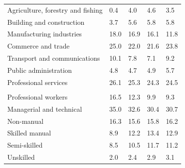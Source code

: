 \documentclass{article}
\begin{document}
\begin{table}[h]
\begin{tabular}{KTTTT}
    \hline
Agriculture, forestry and fishing  & 0.4& 4.0& 4.6& 3.5\\
Building and construction & 3.7& 5.6& 5.8& 5.8\\
Manufacturing industries & 18.0& 16.9& 16.1& 11.8\\
Commerce and trade  & 25.0& 22.0& 21.6& 23.8\\
Transport and communications  & 10.1&  7.8&  7.1&  9.2\\
Public administration & 4.8& 4.7& 4.9& 5.7\\
Professional services & 26.1& 25.3& 24.3& 24.5\\
\hline
    \\ 
    \hline
Professional workers  & 16.5& 12.3 &  9.9&  9.3\\
Managerial and technical & 35.0& 32.6& 30.4& 30.7\\
Non-manual & 16.3& 15.6& 15.8& 16.2\\
Skilled manual &  8.9& 12.2& 13.4& 12.9\\
Semi-skilled &  8.5& 10.5& 11.7& 11.2\\
Unskilled  & 2.0& 2.4& 2.9& 3.1\\
\end{tabular}
\end{table}
\pagebreak
\end{document}
